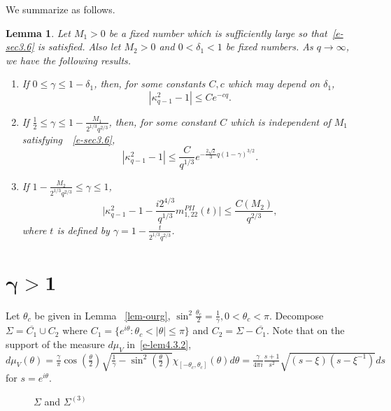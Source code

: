 \documentclass{amsart}
\newtheorem{lem}[thm]{Lemma}
\theoremstyle{definition}
\theoremstyle{remark}
\numberwithin{equation}{section}
\begin{document}
We summarize as follows.
\begin{lem}\label{lem-K1}
  Let $M_1>0$ be a fixed number which is sufficiently large so 
that~\eqref{e-sec3.6} is satisfied. 
Also let $M_2>0$ and  
$0<\delta_1 <1$ be fixed numbers.
As $q\to \infty$, we have the following results.
\begin{enumerate}
    \item If $0\le \gamma \le 1-\delta_1$,  
then, for some constants $C,c$ which may depend on $\delta_1$,
\begin{equation*}
  |\kappa^2_{q-1}- 1 |\le Ce^{-cq}.
\end{equation*}
    \item If $\frac12 \le \gamma \le 1-\frac{M_1}{2^{1/3}q^{2/3}}$, 
then, 
for some constant $C$ which is independent of $M_1$ satisfying~~\eqref{e-sec3.6}, 
\begin{equation*}
  |\kappa^2_{q-1}-1| \le \frac{C}{q^{1/3}}
e^{-\frac{2\sqrt{2}}3q(1-\gamma)^{3/2}}.
\end{equation*}
    \item If $1-\frac{M_2}{2^{1/3}q^{2/3}} \le \gamma \le 1$, 
\begin{equation*}
  \bigl|\kappa^2_{q-1}-1-\frac{i2^{4/3}}{q^{1/3}}m^{PII}_{1,22}(t)\bigr|
\le \frac{C(M_2)}{q^{2/3}}, 
\end{equation*}
where $t$ is defined by $\gamma=1-\frac{t}{2^{1/3}q^{2/3}}$.
\end{enumerate}
\end{lem}




\bigskip
\section{$\mathbf{\gamma > 1}$}
\label{s-K2}

Let $\theta_c$ be given in Lemma ~\ref{lem-ourg}, 
$\sin^2\frac{\theta_c}{2}=\frac{1}{\gamma}, 0< \theta_c<\pi$.
Decompose $\Sigma=\overline{C_1}\cup C_2$ where 
$C_1=\{ e^{i\theta} : \theta_c < |\theta | \le \pi \}$
and $C_2=\Sigma-\overline{C_1}$.
Note that on the support of the measure $d\mu_V$ in~\eqref{e-lem4.3.2}, 
$d\mu_V(\theta)=\frac{\gamma}{\pi} \cos(\frac{\theta }{2}) 
\sqrt{\frac{1}{\gamma} - \sin^2(\frac{\theta}{2})} 
\chi_{[-\theta_c, \theta_c]}(\theta) d\theta
=\frac\gamma{4\pi i} \frac{s+1}{s^2}\sqrt{(s-\xi)(s - \xi^{-1})}ds$ 
for $s=e^{i\theta}$.
\begin{figure}[ht]
 \centerline{}
 \caption{$\Sigma$ and $\Sigma^{(3)}$}\label{fig-Cinout}
\end{figure}
\end{document}
